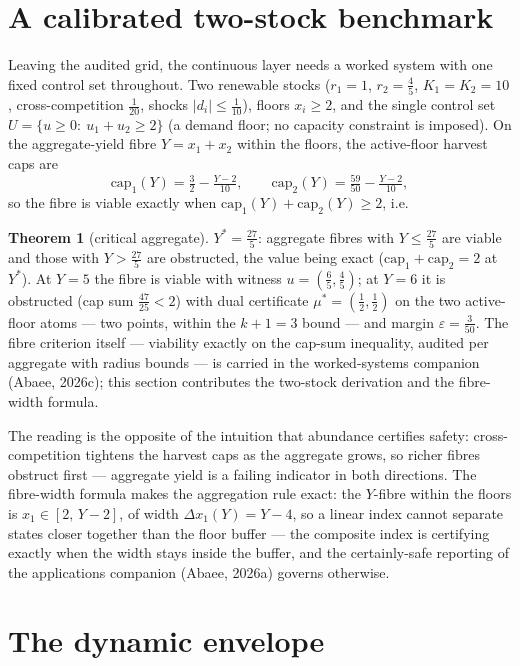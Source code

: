 \documentclass[10pt,twocolumn]{article}
\theoremstyle{definition}
\newtheorem{theorem}{Theorem}
\begin{document}
\section{A calibrated two-stock benchmark}

Leaving the audited grid, the continuous layer needs a worked system with
one fixed control set throughout. Two renewable stocks
($r_{1} = 1$, $r_{2} = \tfrac45$, $K_{1} = K_{2} = 10$, cross-competition
$\tfrac1{20}$, shocks $|d_{i}| \le \tfrac1{10}$), floors
$x_{i} \ge 2$, and the single control set
$U = \{u \ge 0:\ u_{1} + u_{2} \ge 2\}$ (a demand floor; no capacity
constraint is imposed). On the aggregate-yield fibre
$Y = x_{1} + x_{2}$ within the floors, the active-floor harvest caps are
\[
\mathrm{cap}_{1}(Y) = \tfrac32 - \tfrac{Y-2}{10},\qquad
\mathrm{cap}_{2}(Y) = \tfrac{59}{50} - \tfrac{Y-2}{10},
\]
so the fibre is viable exactly when
$\mathrm{cap}_{1}(Y) + \mathrm{cap}_{2}(Y) \ge 2$, i.e.
\begin{theorem}[critical aggregate]\label{thm:benchmark}
$Y^{*} = \tfrac{27}{5}$: aggregate fibres with $Y \le \tfrac{27}{5}$ are
viable and those with $Y > \tfrac{27}{5}$ are obstructed, the value being
exact ($\mathrm{cap}_{1} + \mathrm{cap}_{2} = 2$ at $Y^{*}$). At
$Y = 5$ the fibre is viable with witness $u = (\tfrac65,\tfrac45)$; at
$Y = 6$ it is obstructed (cap sum $\tfrac{47}{25} < 2$) with dual
certificate $\mu^{*} = (\tfrac12,\tfrac12)$ on the two active-floor
atoms --- two points, within the $k+1 = 3$ bound --- and margin
$\varepsilon = \tfrac{3}{50}$. The fibre criterion itself --- viability
exactly on the cap-sum inequality, audited per aggregate with radius
bounds --- is carried in the worked-systems companion (Abaee, 2026c);
this section contributes the two-stock derivation and the fibre-width
formula.
\end{theorem}
The reading is the opposite of the intuition that abundance certifies
safety: cross-competition tightens the harvest caps as the aggregate
grows, so richer fibres obstruct first --- aggregate yield is a failing
indicator in both directions. The fibre-width formula makes the
aggregation rule exact: the $Y$-fibre within the floors is
$x_{1} \in [2,\,Y-2]$, of width $\Delta x_{1}(Y) = Y - 4$, so a linear
index cannot separate states closer together than the floor buffer ---
the composite index is certifying exactly when the width stays inside the
buffer, and the certainly-safe reporting of the applications companion
(Abaee, 2026a) governs otherwise.

\section{The dynamic envelope}
\end{document}

